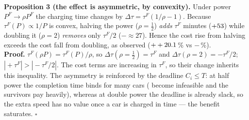 \begin{keybox}
\textbf{Proposition 3 (the effect is asymmetric, by convexity).} Under power $P^F\!\to\!\rho P^F$ the charging time changes by $\Delta\tau=\tau^F(1/\rho-1)$. Because $\tau^F(P)\propto 1/P$ is convex, halving the power ($\rho=\tfrac12$) \emph{adds} $\tau^F$ minutes ($+53$) while doubling it ($\rho=2$) \emph{removes} only $\tau^F/2$ ($-\!\approx\!27$). Hence the cost rise from halving exceeds the cost fall from doubling, as observed ($++20.1$\,\% vs $-$\feNinePowDblDzAbs\,\%).\\[2pt]
\textbf{Proof.} $\tau^F(\rho P)=\tau^F(P)/\rho$, so $\Delta\tau(\rho=\tfrac12)=\tau^F$ and $\Delta\tau(\rho=2)=-\tau^F/2$; $|\!+\!\tau^F|>|\!-\!\tau^F/2|$. The cost terms are increasing in $\tau^F$, so their change inherits this inequality. The asymmetry is reinforced by the deadline $C_i\le T$: at half power the completion time binds for many cars (\feNinePowHalfLost{} become infeasible and the survivors pay heavily), whereas at double power the deadline is already slack, so the extra speed has no value once a car is charged in time --- the benefit saturates. $\square$
\end{keybox}

